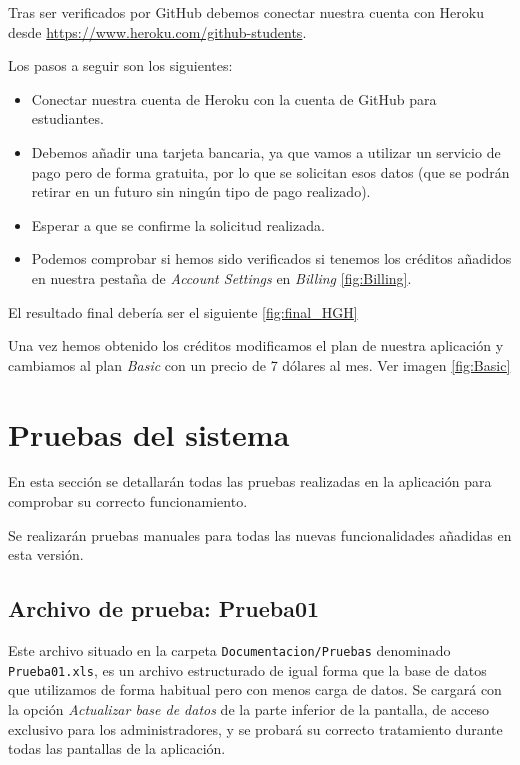


Tras ser verificados por GitHub debemos conectar nuestra cuenta con Heroku desde \href{https://www.heroku.com/github-students}{https://www.heroku.com/github-students}.

Los pasos a seguir son los siguientes:
\begin{itemize}
	\item Conectar nuestra cuenta de Heroku con la cuenta de GitHub para estudiantes.
	\item Debemos añadir una tarjeta bancaria, ya que vamos a utilizar un servicio de pago pero de forma gratuita, por lo que se solicitan esos datos (que se podrán retirar en un futuro sin ningún tipo de pago realizado).
	\item Esperar a que se confirme la solicitud realizada.
	\item Podemos comprobar si hemos sido verificados si tenemos los créditos añadidos en nuestra pestaña de \emph{Account Settings} en \emph{Billing} \ref{fig:Billing}.
\end{itemize}
El resultado final debería ser el siguiente \ref{fig:final_HGH}


Una vez hemos obtenido los créditos modificamos el plan de nuestra aplicación y cambiamos al plan \emph{Basic} con un precio de 7 dólares al mes. Ver imagen \ref{fig:Basic}


\section{Pruebas del sistema}

En esta sección se detallarán todas las pruebas realizadas en la aplicación para comprobar su correcto funcionamiento.

Se realizarán pruebas manuales para todas las nuevas funcionalidades añadidas en esta versión.

\subsection{Archivo de prueba: Prueba01}
Este archivo situado en la carpeta \texttt{Documentacion/Pruebas} denominado \texttt{Prueba01.xls}, es un archivo estructurado de igual forma que la base de datos que utilizamos de forma habitual pero con menos carga de datos.
Se cargará con la opción \emph{Actualizar base de datos} de la parte inferior de la pantalla, de acceso exclusivo para los administradores, y se probará su correcto tratamiento durante todas las pantallas de la aplicación.

